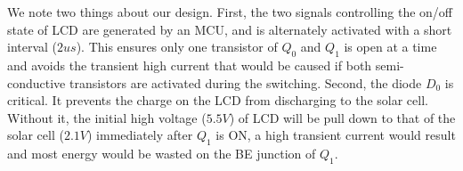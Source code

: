 We note two things about our design. First, the two signals controlling the on/off state of LCD are generated by an MCU, and is alternately activated with a short interval ($2us$). This ensures only one transistor of $Q_0$ and $Q_1$ is open at a time and avoids the transient high current that would be caused if both semi-conductive transistors are activated during the switching. Second, the diode $D_0$ is critical. It prevents the charge on the LCD from discharging to the solar cell. Without it, the initial high voltage ($5.5V$) of LCD will be pull down to that of the solar cell ($2.1V$) immediately after $Q_1$ is ON, a high transient current would result and most energy would be wasted on the BE junction of $Q_1$.

